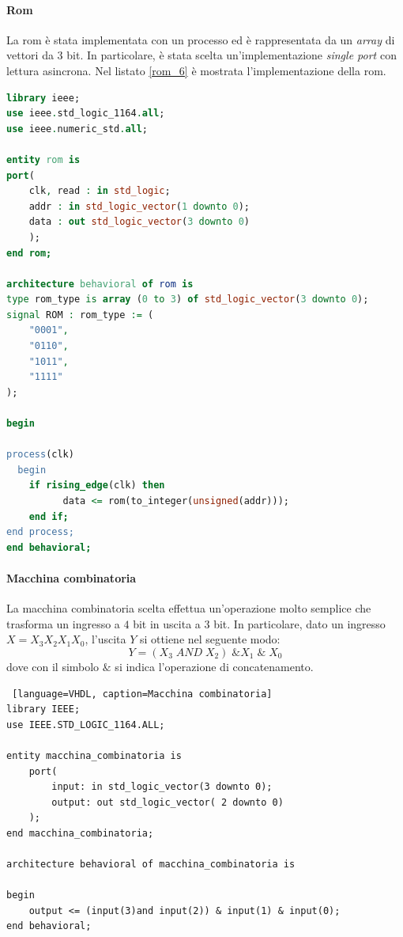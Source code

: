 \paragraph{Rom}
La rom è stata implementata con un processo ed è rappresentata da un \textit{array} di vettori da $3$ bit. In particolare, è stata scelta un'implementazione \textit{single port} con lettura asincrona. Nel listato \ref{rom_6} è mostrata l'implementazione della rom.

\begin{lstlisting}[language=VHDL,label=rom_6, caption=Implelemtazione automa a stati finiti]
library ieee;
use ieee.std_logic_1164.all;
use ieee.numeric_std.all;

entity rom is
port(
    clk, read : in std_logic; 
    addr : in std_logic_vector(1 downto 0);
    data : out std_logic_vector(3 downto 0)
    );
end rom;

architecture behavioral of rom is 
type rom_type is array (0 to 3) of std_logic_vector(3 downto 0);
signal ROM : rom_type := (
    "0001", 
    "0110", 
    "1011", 
    "1111"
);

begin

process(clk)
  begin
    if rising_edge(clk) then
          data <= rom(to_integer(unsigned(addr)));
    end if;
end process;
end behavioral;
\end{lstlisting}

\paragraph{Macchina combinatoria}
La macchina combinatoria scelta effettua un'operazione molto semplice che trasforma un ingresso a $4$ bit in uscita a $3$ bit. In particolare, dato un ingresso $X=X_3X_2X_1X_0$, l'uscita $Y$ si ottiene nel seguente modo:
\begin{equation*}
    Y = (X_3\;AND\;X_2)\;\&X_1\;\&\;X_0
\end{equation*}
dove con il simbolo $\&$ si indica l'operazione di concatenamento.
 
\begin{lstlisting} [language=VHDL, caption=Macchina combinatoria]
library IEEE;
use IEEE.STD_LOGIC_1164.ALL;

entity macchina_combinatoria is
    port(
        input: in std_logic_vector(3 downto 0);
        output: out std_logic_vector( 2 downto 0)
    );
end macchina_combinatoria;

architecture behavioral of macchina_combinatoria is

begin
    output <= (input(3)and input(2)) & input(1) & input(0);
end behavioral;

\end{lstlisting}

